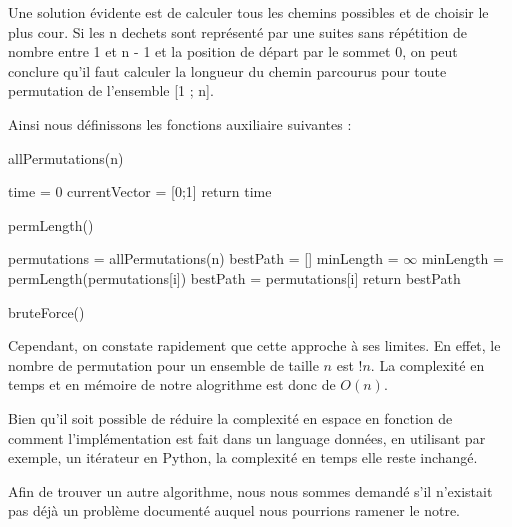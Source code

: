 \documentclass{report}
\begin{document}
Une solution évidente est de calculer tous les chemins possibles et de choisir le plus cour. Si les n dechets sont représenté par une suites sans répétition de nombre entre 1 et n - 1 et la position de départ par le sommet 0, on peut conclure qu'il faut calculer la longueur du chemin parcourus pour toute permutation de l'ensemble [1 ; n].

Ainsi nous définissons les fonctions auxiliaire suivantes : \\

\begin{algorithm}[H]
  \SetAlgoLined
  \caption{allPermutations(n)}
\end{algorithm}

\begin{algorithm}[H]
    \SetAlgoLined
    time = 0\;
    currentVector = [0;1]\;
    return time\;
    \caption{permLength()}
  \end{algorithm}

  \begin{algorithm}[H]
    \SetAlgoLined
    permutations = allPermutations(n)\;
    bestPath = []\;
    minLength = $\infty$ \;
    {
        {
            minLength = permLength(permutations[i])\;
            bestPath = permutations[i]\;
        }
    }
    return bestPath\;
    \caption{bruteForce()}
  \end{algorithm}

  Cependant, on constate rapidement que cette approche à ses limites. En effet, le nombre de permutation pour un ensemble de taille $n$ est $!n$. La complexité en temps et en mémoire de notre alogrithme est donc de $O(n)$.

  Bien qu'il soit possible de réduire la complexité en espace en fonction de comment l'implémentation est fait dans un language données, en utilisant par exemple, un itérateur en Python, la complexité en temps elle reste inchangé.

  Afin de trouver un autre algorithme, nous nous sommes demandé s'il n'existait pas déjà un problème documenté auquel nous pourrions ramener le notre.
\end{document}
